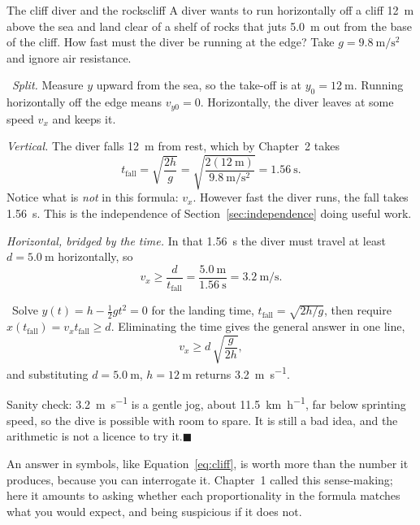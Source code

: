 \documentclass[11pt,twoside,openany]{book}
\newcounter{check}[chapter]
\newcommand{\viewtag}[3]{\fcolorbox{#2}{#3}{\footnotesize\textbf{\textcolor{#2}{#1}}}}
\newcommand{\elemtag}{\viewtag{Elementary}{elemcol}{elempale}}
\newcommand{\calctag}{\viewtag{Calculus}{calccol}{calcpale}}
\newcommand{\elem}{\par\medskip\noindent\elemtag\ }
\newcommand{\calc}{\par\medskip\noindent\calctag\ }
\newcommand{\qed}{\hfill$\blacksquare$}
\begin{document}
\begin{example}{The cliff diver and the rocks}{cliff}
A diver wants to run horizontally off a cliff \SI{12}{\metre} above the sea and land clear of a shelf of rocks that juts \SI{5.0}{\metre} out from the base of the cliff. How fast must the diver be running at the edge? Take $g = \SI{9.8}{\metre\per\second\squared}$ and ignore air resistance.

\elem \emph{Split.} Measure $y$ upward from the sea, so the take-off is at $y_0 = \SI{12}{\metre}$. Running horizontally off the edge means $v_{y0} = 0$. Horizontally, the diver leaves at some speed $v_x$ and keeps it.

\emph{Vertical.} The diver falls \SI{12}{\metre} from rest, which by Chapter~2 takes
\[
t_{\text{fall}} = \sqrt{\frac{2h}{g}} = \sqrt{\frac{2(\SI{12}{\metre})}{\SI{9.8}{\metre\per\second\squared}}} = \SI{1.56}{\second}.
\]
Notice what is \emph{not} in this formula: $v_x$. However fast the diver runs, the fall takes \SI{1.56}{\second}. This is the independence of Section~\ref{sec:independence} doing useful work.

\emph{Horizontal, bridged by the time.} In that \SI{1.56}{\second} the diver must travel at least $d = \SI{5.0}{\metre}$ horizontally, so
\[
v_x \ge \frac{d}{t_{\text{fall}}} = \frac{\SI{5.0}{\metre}}{\SI{1.56}{\second}} = \SI{3.2}{\metre\per\second}.
\]

\calc Solve $y(t) = h - \tfrac12 g t^2 = 0$ for the landing time, $t_{\text{fall}} = \sqrt{2h/g}$, then require $x(t_{\text{fall}}) = v_x t_{\text{fall}} \ge d$. Eliminating the time gives the general answer in one line,
\begin{equation}
v_x \ge d\,\sqrt{\frac{g}{2h}},
\label{eq:cliff}
\end{equation}
and substituting $d = \SI{5.0}{\metre}$, $h = \SI{12}{\metre}$ returns \SI{3.2}{\metre\per\second}.

Sanity check: \SI{3.2}{\metre\per\second} is a gentle jog, about \SI{11.5}{\kilo\metre\per\hour}, far below sprinting speed, so the dive is possible with room to spare. It is still a bad idea, and the arithmetic is not a licence to try it.\qed
\end{example}

An answer in symbols, like Equation~\eqref{eq:cliff}, is worth more than the number it produces, because you can interrogate it. Chapter~1 called this sense-making; here it amounts to asking whether each proportionality in the formula matches what you would expect, and being suspicious if it does not.
\end{document}
